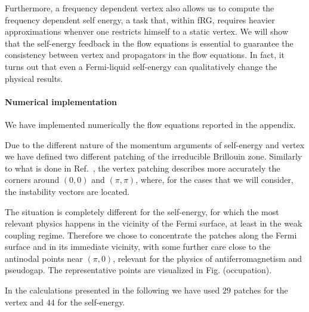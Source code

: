 Furthermore, a frequency dependent vertex also allows us to compute the frequency dependent self energy, a task that, within fRG, requires heavier approximations whenver one restricts himself to a static vertex.  
We will show that the self-energy feedback in the flow equations is essential to guarantee the consistency between vertex and propagators in the flow equations.
In fact, it turns out that even a Fermi-liquid self-energy can qualitatively change the physical results. 

\paragraph*{Numerical implementation}
We have implemented numerically the flow equations reported in the appendix. 

Due to the different nature of the momentum arguments of self-energy and vertex we have defined two different patching of the irreducible Brillouin zone. 
Similarly to what is done in Ref.~, the vertex patching describes more accurately the corners around $(0,0)$ and $(\pi,\pi)$, where, for the cases that we will consider, the instability vectors are located.

The situation is completely different for the self-energy, for which the most relevant physics happens in the vicinity of the Fermi surface, at least in the weak coupling regime. Therefore we chose to concentrate the patches along the Fermi surface and in its immediate vicinity, with some further care close to the antinodal points near $(\pi,0)$, relevant for the physics of antiferromagnetism and pseudogap. The representative points are visualized in Fig. (occupation). 

In the calculations presented in the following we have used $29$ patches for the vertex and $44$ for the self-energy.


